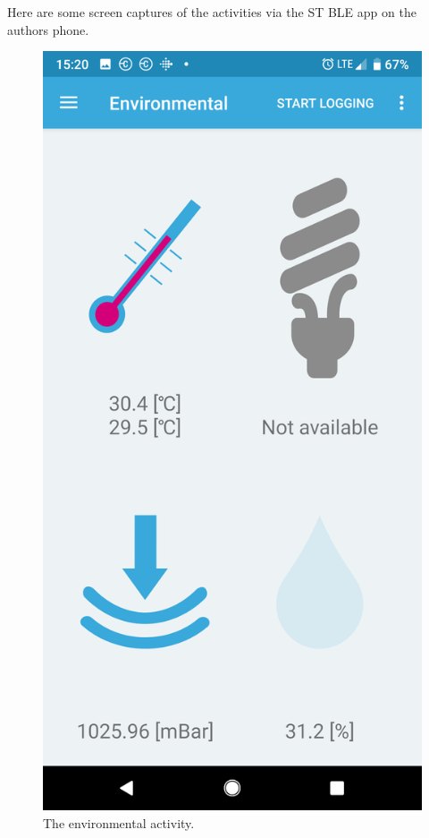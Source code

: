 \documentclass[11pt]{article}
\numberwithin{figure}{section}
\begin{document}
Here are some screen captures of the activities via the ST BLE app on
the authors phone.

\begin{figure}[H] %
\centering
\includegraphics[scale=0.3]{environmental.png}
\caption{The environmental activity.}
\label{Figure: Environment}
\end{figure}
\end{document}
